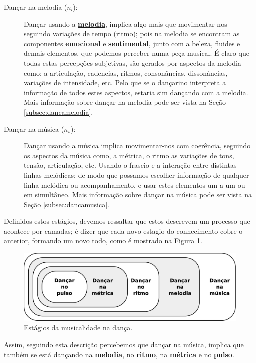 \begin{description}
\item[Dançar na melodia  ($n_l$):] Dançar usando a \hyperref[sec:pos:Melodia]{\textbf{melodia}},
implica algo mais que movimentar-nos seguindo variações de tempo (ritmo); 
pois na melodia se encontram as componentes \hyperref[ref:emotionsentimental]{\textbf{emocional}} 
e \hyperref[ref:emotionsentimental]{\textbf{sentimental}}, junto com a beleza, fluides e demais elementos, 
que podemos perceber numa peça musical.
É claro que todas estas percepções subjetivas, 
são gerados por aspectos da melodia como: a articulação, cadencias, ritmos, consonâncias, dissonâncias,
variações de intensidade, etc. 
Pelo que se o dançarino interpreta a informação de todos estes aspectos,
estaria sim dançando com a melodia.
Mais informação sobre dançar na melodia pode ser vista na Seção \ref{subsec:dancamelodia}.
\item[Dançar na música  ($n_s$):] 
Dançar usando a música implica movimentar-nos com coerência, 
seguindo os aspectos da música como, a métrica, 
o ritmo as variações de tons, tensão, articulação, etc.
Usando o fraseio e a interação entre distintas linhas melódicas;
de modo que possamos escolher informação de qualquer linha melódica ou acompanhamento,
e usar estes elementos um a um ou em simultâneo.
Mais informação sobre dançar na música pode ser vista na Seção \ref{subsec:dancamusica}.
\end{description}


Definidos estos estágios, 
devemos ressaltar que estos descrevem um processo que acontece por camadas;
é dizer que cada novo estagio do conhecimento cobre o anterior, formando um novo todo,
como é mostrado na Figura \ref{fig:aspectos-musica}.
\begin{figure}[h!]
    \centering
    \includegraphics[width=\textwidth]{chapters/cap-musicalidade-tecnica/aspectos-musica.eps}
    \caption{Estágios da musicalidade na dança.}
    \label{fig:aspectos-musica}
\end{figure}
Assim, seguindo esta descrição percebemos que dançar na música, 
implica que também se está dançando na \hyperref[sec:pos:Melodia]{\textbf{melodia}}, 
no \hyperref[sec:pos:Ritmo]{\textbf{ritmo}}, 
na \hyperref[def:Metrica]{\textbf{métrica}} e 
no \hyperref[ref:Pulso]{\textbf{pulso}}.



